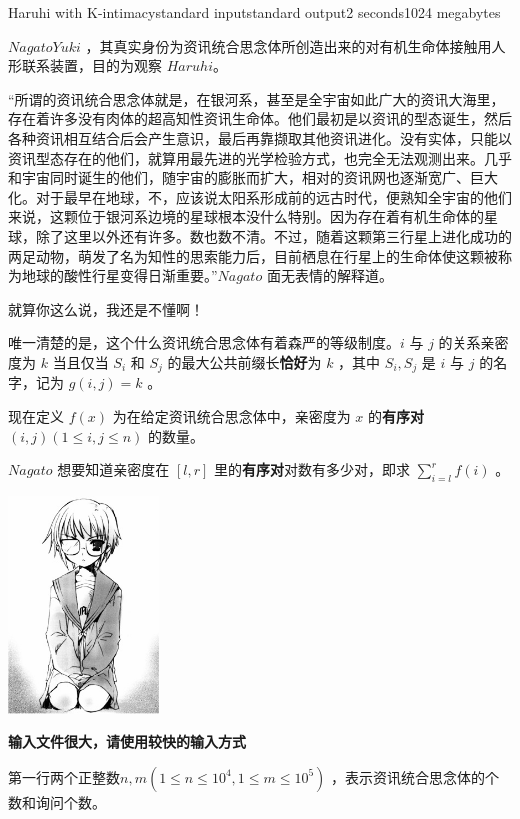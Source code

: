 \begin{problem}{Haruhi with K-intimacy}{standard input}{standard output}{2 seconds}{1024 megabytes}

$Nagato Yuki$ ，其真实身份为资讯统合思念体所创造出来的对有机生命体接触用人形联系装置，目的为观察 $Haruhi$。

“所谓的资讯统合思念体就是，在银河系，甚至是全宇宙如此广大的资讯大海里，存在着许多没有肉体的超高知性资讯生命体。他们最初是以资讯的型态诞生，然后各种资讯相互结合后会产生意识，最后再靠撷取其他资讯进化。没有实体，只能以资讯型态存在的他们，就算用最先进的光学检验方式，也完全无法观测出来。几乎和宇宙同时诞生的他们，随宇宙的膨胀而扩大，相对的资讯网也逐渐宽广、巨大化。对于最早在地球，不，应该说太阳系形成前的远古时代，便熟知全宇宙的他们来说，这颗位于银河系边境的星球根本没什么特别。因为存在着有机生命体的星球，除了这里以外还有许多。数也数不清。不过，随着这颗第三行星上进化成功的两足动物，萌发了名为知性的思索能力后，目前栖息在行星上的生命体使这颗被称为地球的酸性行星变得日渐重要。”$Nagato$ 面无表情的解释道。

就算你这么说，我还是不懂啊！

唯一清楚的是，这个什么资讯统合思念体有着森严的等级制度。$i$ 与 $j$ 的关系亲密度为 $k$ 当且仅当 $S_i$ 和 $S_j$ 的最大公共前缀长\textbf{恰好}为 $k$ ，其中 $S_i,S_j$ 是 $i$ 与 $j$ 的名字，记为 $g(i,j)=k$ 。 

现在定义 $f(x)$ 为在给定资讯统合思念体中，亲密度为 $x$ 的\textbf{有序对} $(i,j)(1 \leq i,j \leq n)$ 的数量。

$Nagato$ 想要知道亲密度在 $[l,r]$ 里的\textbf{有序对}对数有多少对，即求 $\sum_{i=l}^r f(i)$ 。

\begin{center}
\includegraphics[width=0.3\textwidth]{pics/K.jpg}
\end{center}

\InputFile

\textbf{输入文件很大，请使用较快的输入方式}

第一行两个正整数$n,m(1 \leq n \leq 10^4,1 \leq m \leq 10^5)$ ，表示资讯统合思念体的个数和询问个数。


\end{problem}

